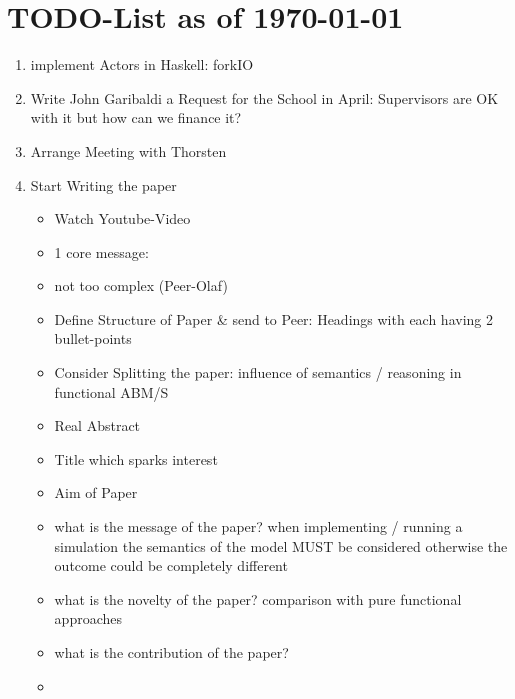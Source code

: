 \section{TODO-List as of \today}

\begin{enumerate}
\item implement Actors in Haskell: forkIO

\item Write John Garibaldi a Request for the School in April: Supervisors are OK with it but how can we finance it?

\item Arrange Meeting with Thorsten

\item Start Writing the paper
	\begin{itemize}
		\item Watch Youtube-Video
		\item 1 core message:
		\item not too complex (Peer-Olaf)
		\item Define Structure of Paper \& send to Peer: Headings with each having 2 bullet-points
		\item Consider Splitting the paper: influence of semantics / reasoning in functional ABM/S
		\item Real Abstract
		\item Title which sparks interest
		\item Aim of Paper
		\item what is the message of the paper? when implementing / running a simulation the semantics of the model MUST be considered otherwise the outcome could be completely different
		\item what is the novelty of the paper? comparison with pure functional approaches
		\item what is the contribution of the paper? 
		\item 
	\end{itemize}


\end{enumerate}

